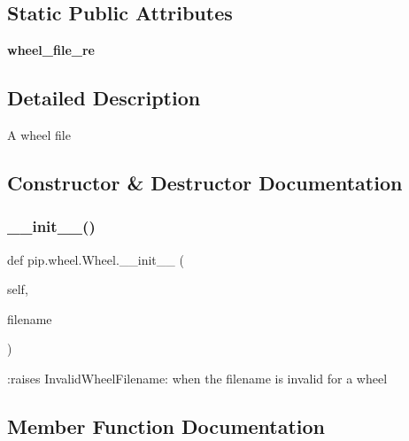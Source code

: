 \subsection*{Static Public Attributes}
\begin{DoxyCompactItemize}
\item 
{\bfseries wheel\+\_\+file\+\_\+re}
\end{DoxyCompactItemize}


\subsection{Detailed Description}
\begin{DoxyVerb}A wheel file\end{DoxyVerb}
 

\subsection{Constructor \& Destructor Documentation}
\mbox{\label{classpip_1_1wheel_1_1_wheel_a3c840ab1d24d7890c3f166ea42e44f77}} 
\subsubsection{\texorpdfstring{\+\_\+\+\_\+init\+\_\+\+\_\+()}{\_\_init\_\_()}}
{\footnotesize\ttfamily def pip.\+wheel.\+Wheel.\+\_\+\+\_\+init\+\_\+\+\_\+ (\begin{DoxyParamCaption}\item[{}]{self,  }\item[{}]{filename }\end{DoxyParamCaption})}

\begin{DoxyVerb}:raises InvalidWheelFilename: when the filename is invalid for a wheel
\end{DoxyVerb}
 

\subsection{Member Function Documentation}
\mbox{\label{classpip_1_1wheel_1_1_wheel_a1bdc31c4f4d945960210b49b5ebff4ba}} 
